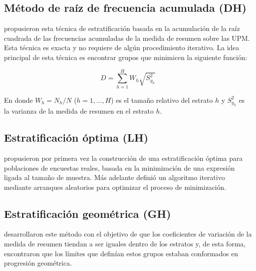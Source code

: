 \documentclass[
  10pt,
  spanish,
]{book}
\begin{document}
\hypertarget{muxe9todo-de-rauxedz-de-frecuencia-acumulada-dh}{%
\subsection*{Método de raíz de frecuencia acumulada (DH)}\label{muxe9todo-de-rauxedz-de-frecuencia-acumulada-dh}}

\citet{Dalenius_Hodges_1959} propusieron esta técnica de estratificación basada en la acumulación de la raíz cuadrada de las frecuencias acumuladas de la medida de resumen sobre las UPM. Esta técnica es exacta y no requiere de algún procedimiento iterativo. La idea principal de esta técnica es encontrar grupos que minimicen la siguiente función:

\[
D = \sum_{h=1}^H W_h \sqrt{S^2_{y_{h}}}
\]

En donde \(W_h = N_h/N\) (\(h = 1, \ldots, H\)) es el tamaño relativo del estrato \(h\) y \(S^2_{y_{h}}\) es la varianza de la medida de resumen en el estrato \(h\).

\hypertarget{estratificaciuxf3n-uxf3ptima-lh}{%
\subsection*{Estratificación óptima (LH)}\label{estratificaciuxf3n-uxf3ptima-lh}}

\citet{Lavallee_Hidiroglou_1988} propusieron por primera vez la construcción de una estratificación óptima para poblaciones de encuestas reales, basada en la minimización de una expresión ligada al tamaño de muestra. Más adelante \citet{Kozak_2004} definió un algoritmo iterativo mediante arranques aleatorios para optimizar el proceso de minimización.

\hypertarget{estratificaciuxf3n-geomuxe9trica-gh}{%
\subsection*{Estratificación geométrica (GH)}\label{estratificaciuxf3n-geomuxe9trica-gh}}

\citet{Gunning_Horgan_2004} desarrollaron este método con el objetivo de que los coeficientes de variación de la medida de resumen tiendan a ser iguales dentro de los estratos y, de esta forma, encontraron que los límites que definían estos grupos estaban conformados en progresión geométrica.
\end{document}

